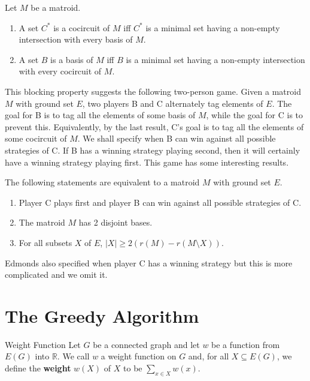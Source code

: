 \documentclass[a4paper,10pt]{article}
\renewcommand{\vocab}[1]{\textbf{#1}}
\begin{document}
\begin{theorem}[thm:]{}
  Let $M$ be a matroid.
  \begin{enumerate}
    \item A set $C^*$ is a cocircuit of $M$ iff $C^*$ is a minimal set having a non-empty intersection with every basis of $M$.
    \item A set $B$ is a basis of $M$ iff $B$ is a minimal set having a non-empty intersection with every cocircuit of $M$.
  \end{enumerate}
\end{theorem}

This blocking property suggests the following two-person game. Given a matroid $M$ with ground set $E$, two players B and C alternately tag elements of $E$. The goal for B is to tag all the elements of some basis of $M$, while the goal for C is to prevent this. Equivalently, by the last result, C’s goal is to tag all the elements of some cocircuit of $M$. We shall specify when B can win against all possible strategies of C. If B has a winning strategy playing second, then it will certainly have a winning strategy playing first. This game has some interesting results.

\begin{theorem}[thm:]{}
  The following statements are equivalent to a matroid $M$ with ground set $E$.
  \begin{enumerate}
    \item Player C plays first and player B can win against all possible strategies of C.
    \item The matroid $M$ has 2 disjoint bases.
    \item For all subsets $X$ of $E$, $|X|\geq 2(r(M)-r(M\setminus X))$.
  \end{enumerate}
  \begin{remark}
    Edmonds also specified when player C has a winning strategy but this is more complicated and we omit it.
  \end{remark}
\end{theorem}

\section{The Greedy Algorithm}

\begin{definition}[def:]{Weight Function}
  Let $G$ be a connected graph and let $w$ be a function from $E(G)$ into $\mathbb{R}$. We call $w$ a weight function on $G$ and, for all $X\subseteq E(G)$, we define the \vocab{weight} $w(X)$ of $X$ to be $\sum_{x\in X}^{}w(x)$.
\end{definition}
\end{document}
